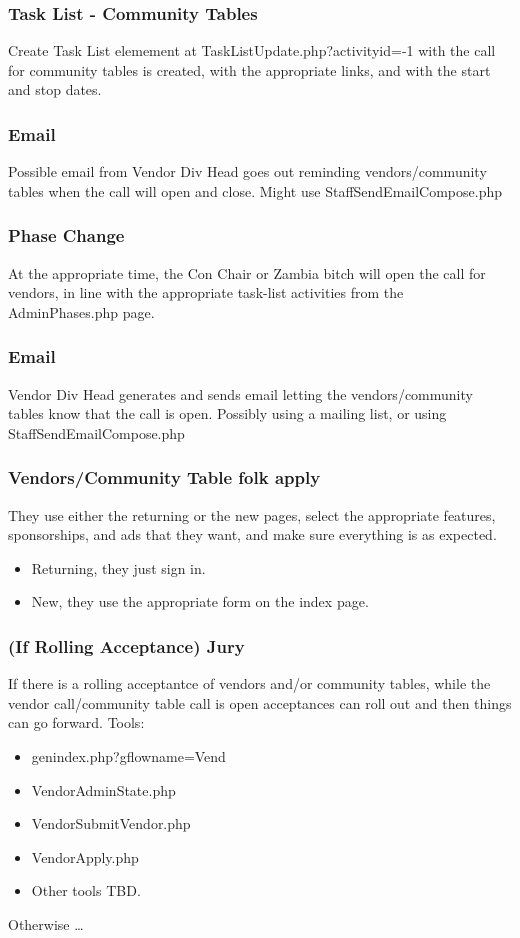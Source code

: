 \documentclass[captions=tablesignature]{scrartcl}
\begin{document}
\subsubsection{Task List - Community Tables}
\label{sec-3-2-8}
Create Task List elemement at TaskListUpdate.php?activityid=-1
with the call for community tables is created, with the
appropriate links, and with the start and stop dates.

\subsubsection{Email}
\label{sec-3-2-9}
Possible email from Vendor Div Head goes out reminding
vendors/community tables when the call will open and close.
Might use StaffSendEmailCompose.php

\subsubsection{Phase Change}
\label{sec-3-2-10}
At the appropriate time, the Con Chair or Zambia bitch will open
the call for vendors, in line with the appropriate task-list
activities from the AdminPhases.php page.

\subsubsection{Email}
\label{sec-3-2-11}
Vendor Div Head generates and sends email letting the
vendors/community tables know that the call is open.
Possibly using a mailing list, or using StaffSendEmailCompose.php

\subsubsection{Vendors/Community Table folk apply}
\label{sec-3-2-12}
They use either the returning or the new pages, select the
appropriate features, sponsorships, and ads that they want, and
make sure everything is as expected.
\begin{itemize}
\item Returning, they just sign in.
\item New, they use the appropriate form on the index page.
\end{itemize}

\subsubsection{(If Rolling Acceptance) Jury}
\label{sec-3-2-13}
If there is a rolling acceptantce of vendors and/or community
tables, while the vendor call/community table call is open
acceptances can roll out and then things can go forward.
Tools: 
\begin{itemize}
\item genindex.php?gflowname=Vend
\item VendorAdminState.php
\item VendorSubmitVendor.php
\item VendorApply.php
\item Other tools TBD.
\end{itemize}
Otherwise \ldots{}
\end{document}
